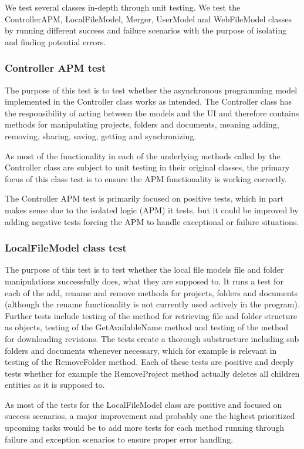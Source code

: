We test several classes in-depth through unit testing. We test the ControllerAPM, LocalFileModel, Merger, UserModel and WebFileModel classes by running different success and failure scenarios with the purpose of isolating and finding potential errors.

\subsubsection{Controller APM test}
The purpose of this test is to test whether the asynchronous programming model implemented in the Controller class works as intended. The Controller class has the responsibility of acting between the models and the UI and therefore contains methods for manipulating projects, folders and documents, meaning adding, removing, sharing, saving, getting and synchronizing.

As most of the functionality in each of the underlying methods called by the Controller class are subject to unit testing in their original classes, the primary focus of this class test is to ensure the APM functionality is working correctly.

The Controller APM test is primarily focused on positive tests, which in part makes sense due to the isolated logic (APM) it tests, but it could be improved by adding negative tests forcing the APM to handle exceptional or failure situations.

\subsubsection{LocalFileModel class test}
The purpose of this test is to test whether the local file models file and folder manipulations successfully does, what they are supposed to. It runs a test for each of the add, rename and remove methods for projects, folders and documents (although the rename functionality is not currently used actively in the program). Further tests include testing of the method for retrieving file and folder structure as objects, testing of the GetAvailableName method and testing of the method for downloading revisions. The tests create a thorough substructure including sub folders and documents whenever necessary, which for example is relevant in testing of the RemoveFolder method. Each of these tests are positive and deeply tests whether for example the RemoveProject method actually deletes all children entities as it is supposed to.

As most of the tests for the LocalFileModel class are positive and focused on success scenarios, a major improvement and probably one the highest prioritized upcoming tasks would be to add more tests for each method running through failure and exception scenarios to ensure proper error handling.

